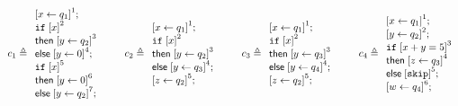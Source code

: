 \documentclass[a4paper,11pt]{article}
\begin{document}
\[
c_1 \triangleq
\begin{array}{l}
     \left[x \leftarrow q_1 \right]^1; \\
    \eif \; \left[x \right]^2\; \\
    \mathsf{then} \; \left[y \leftarrow q_2 \right]^3\; \\
    \mathsf{else} \; \left[y \leftarrow 0 \right]^4; \\
    \eif \; \left[x \right]^5\; \\
    \mathsf{then} \; \left[ y \leftarrow 0 \right]^6\; \\
    \mathsf{else} \; \left[y \leftarrow q_2 \right]^7; \\
\end{array}
%
\hspace{20pt}
%
c_2 \triangleq
\begin{array}{l}
     \left[x \leftarrow q_1\right]^1 ; \\
    \eif \; \left[x \right]^2\; \\
    \mathsf{then} \; \left[y \leftarrow q_2\right]^3 \; \\
    \mathsf{else} \; \left[y \leftarrow q_3\right]^4 ; \\
    \left[z \leftarrow q_2 \right]^5; \\
\end{array}
%
\hspace{20pt}
%
c_3 \triangleq
\begin{array}{l}
     \left[x \leftarrow q_1 \right]^1; \\
    \eif \; \left[x \right]^2\; \\
    \mathsf{then} \; \left[y \leftarrow q_3 \right]^3\; \\
    \mathsf{else} \; \left[y \leftarrow q_4 \right]^4; \\
    \left[z \leftarrow q_2 \right]^5; \\
\end{array}
%
\hspace{20pt}
%
c_4 \triangleq
\begin{array}{l}
   \left[ x \leftarrow q_1 \right]^1; \\
   \left[y \leftarrow q_2\right]^2 ; \\
    \eif \;\left[ x + y = 5 \right]^3\; \\
    \mathsf{then} \;\left[ z \leftarrow q_3\right]^4 \; \\
    \mathsf{else} \;\left[ \eskip\right]^5 ; \\
   \left[ w \leftarrow q_4 \right]^6; \\
\end{array}
\]
\end{document}

